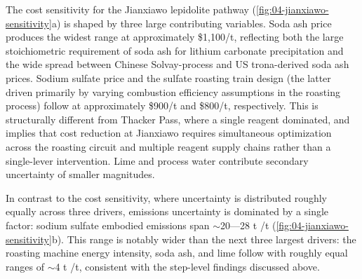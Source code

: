 The cost sensitivity for the Jianxiawo lepidolite pathway (\ref{fig:04-jianxiawo-sensitivity}a) is shaped by three large contributing variables. Soda ash price produces the widest range at approximately \$1,100/t, reflecting both the large stoichiometric requirement of soda ash for lithium carbonate precipitation and the wide spread between Chinese Solvay-process and US trona-derived soda ash prices. Sodium sulfate price and the sulfate roasting train design (the latter driven primarily by varying combustion efficiency assumptions in the roasting process) follow at approximately \$900/t and \$800/t, respectively. This is structurally different from Thacker Pass, where a single reagent dominated, and implies that cost reduction at Jianxiawo requires simultaneous optimization across the roasting circuit and multiple reagent supply chains rather than a single-lever intervention. Lime and process water contribute secondary uncertainty of smaller magnitudes. 

In contrast to the cost sensitivity, where uncertainty is distributed roughly equally across three drivers, emissions uncertainty is dominated by a single factor: sodium sulfate embodied emissions span $\sim$20---28 t /t  (\ref{fig:04-jianxiawo-sensitivity}b). This range is notably wider than the next three largest drivers: the roasting machine energy intensity, soda ash, and lime follow with roughly equal ranges of $\sim$4 t /t, consistent with the step-level findings discussed above.

